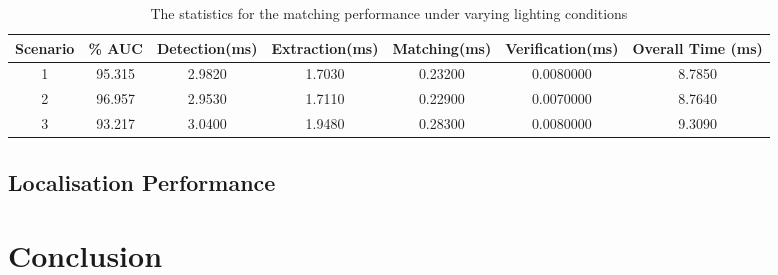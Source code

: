 \documentclass{article}
\begin{document}
\begin{table}
\caption{The statistics for the matching performance under varying lighting conditions}
\begin{tabular}{|c|c|c|c|c|c|c|}
\hline 
Scenario & \% AUC & Detection(ms) & Extraction(ms) & Matching(ms) & Verification(ms) & Overall Time (ms)\tabularnewline
\hline 
\hline 
1 & 95.315 & 2.9820 & 1.7030 & 0.23200 & 0.0080000 & 8.7850\tabularnewline
\hline 
2 & 96.957 & 2.9530 & 1.7110 & 0.22900 & 0.0070000 & 8.7640\tabularnewline
\hline 
3 & 93.217 & 3.0400 & 1.9480 & 0.28300 & 0.0080000 & 9.3090\tabularnewline
\hline 
\end{tabular}
\label{tab:lightingStats}
\end{table}

\subsection{Localisation Performance}
\label{sec:localisationPerformance}







\section{Conclusion}
\label{sec:conclusion}



%
%
 
\end{document}
